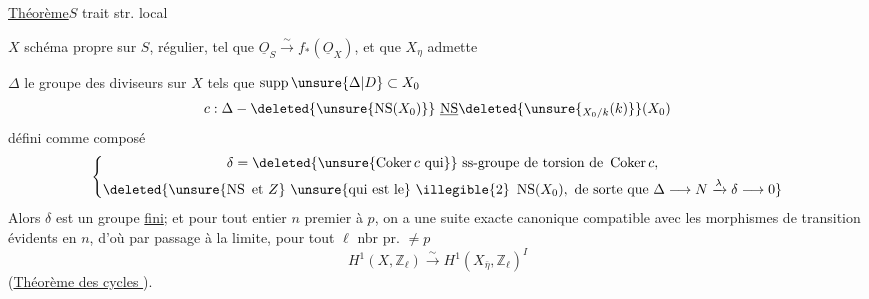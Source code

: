 
\uline{Théorème}\quad $S$ trait str. local

$X$ schéma propre sur $S$, régulier, tel que $\underline O_S\xrightarrow{\sim}f_*(\underline O_X)$, et que $X_\eta$ admette 

$\Delta$ le groupe des diviseurs sur $X$ tels que $\operatorname{supp}\unsure{\Delta|D}\subset X_0$
\[
c:\Delta\mathbin{-}\deleted{\unsure{\operatorname{NS}(X_0)}}\ \underline{\operatorname{NS}}\deleted{\unsure{{}_{X_0/k}(k)}}(X_0)
\]
défini comme composé
\[
\left\{\begin{gathered}
\delta=\deleted{\unsure{\operatorname{Coker}c\text{ qui}}}\ \text{ss-groupe de torsion de }\operatorname{Coker}c,\\
\deleted{\unsure{\operatorname{NS}\text{ et }Z}\ \text{\unsure{qui est le}}\ \text{\illegible{2}}\ \operatorname{NS}(X_0),\ \text{de sorte que }\Delta\longrightarrow N\xrightarrow{\lambda}\delta\longrightarrow0}
\end{gathered}\right.
\]
 Alors $\delta$ est un groupe \uline{fini};  et pour tout entier $n$ premier à $p$, on a une suite exacte canonique
compatible avec les morphismes de transition évidents en $n$, d'où par passage à la limite, pour tout $\ell$ nbr pr. $\neq p$
\[
H^1(X,\mathbb Z_\ell)\xrightarrow{\sim}H^1(X_{\bar\eta},\mathbb Z_\ell)^I
\]
(\uline{Théorème des cycles }).

